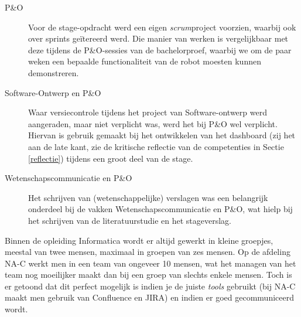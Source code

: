 \documentclass[10pt,a4paper]{article}
\begin{document}
\begin{description}
\item[P\&O]
Voor de stage-opdracht werd een eigen \textit{scrum}project voorzien, waarbij ook over sprints ge\"itereerd werd. Die manier van werken is vergelijkbaar met deze tijdens de P\&O-sessies van de bachelorproef, waarbij we om de paar weken een bepaalde functionaliteit van de robot moesten kunnen demonstreren.

\item[Software-Ontwerp en P\&O]

Waar versiecontrole tijdens het project van Software-ontwerp werd aangeraden, maar niet verplicht was, werd het bij P\&O wel verplicht. Hiervan is gebruik gemaakt bij het ontwikkelen van het dashboard (zij het aan de late kant, zie de kritische reflectie van de competenties in Sectie \ref{reflectie}) tijdens een groot deel van de stage.

\item[Wetenschapscommunicatie en P\&O]

Het schrijven van (wetenschappelijke) verslagen was een belangrijk onderdeel bij de vakken Wetenschapscommunicatie en P\&O, wat hielp bij het schrijven van de literatuurstudie en het stageverslag.
\end{description}
Binnen de opleiding Informatica wordt er altijd gewerkt in kleine groepjes, meestal van twee mensen, maximaal in groepen van zes mensen. Op de afdeling NA-C werkt men in een team van ongeveer 10 mensen, wat het managen van het team nog moeilijker maakt dan bij een groep van slechts enkele mensen. Toch is er getoond dat dit perfect mogelijk is indien je de juiste \textit{tools} gebruikt (bij NA-C maakt men gebruik van Confluence en JIRA) en indien er goed gecommuniceerd wordt.
\end{document}
